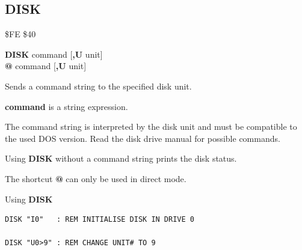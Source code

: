 \subsection{DISK}
\begin{description}[leftmargin=2cm,style=nextline]
\item [Token:]    \$FE \$40

\item [Format:]   {\bf DISK} command [{\bf,U} unit] \\
                  {\bf @} command [{\bf,U} unit]

\item [Usage:]    Sends a command string to the specified disk unit.

                  \unitdefinition

                  {\bf command} is a string expression.

\item [Remarks:]  The command string is interpreted by the disk unit and must be compatible to the used DOS version. Read the disk drive manual for possible commands.

                  Using {\bf DISK} without a command string prints the disk status.

                  The shortcut {\bf @} can only be used in direct mode.

\item [Examples:] Using {\bf DISK}

\begin{tcolorbox}[colback=black,coltext=white]
\verbatimfont{\codefont}
\begin{verbatim}
DISK "I0"   : REM INITIALISE DISK IN DRIVE 0

DISK "U0>9" : REM CHANGE UNIT# TO 9
\end{verbatim}
\end{tcolorbox}
\end{description}


\newpage
